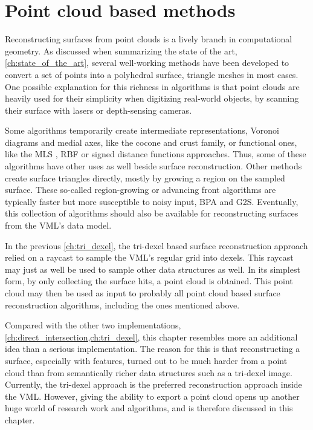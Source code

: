 
\chapter{Point cloud based methods}
\label{ch:point_cloud_based}

Reconstructing surfaces from point clouds is a lively branch in computational geometry.
As discussed when summarizing the state of the art, \cf \cref{ch:state_of_the_art}, several well-working methods have been developed to convert a set of points into a polyhedral surface, \ie triangle meshes in most cases.
One possible explanation for this richness in algorithms is that point clouds are heavily used for their simplicity when digitizing real-world objects, \eg by scanning their surface with lasers or depth-sensing cameras.

Some algorithms temporarily create intermediate representations, \eg Voronoi diagrams and medial axes, like the cocone \cite{cocone, tight_cocone, robust_cocone} and crust \cite{crust, power_crust} family, or functional ones, like the MLS \cite{mls}, RBF \cite{rbf} or signed distance functions \cite{sdf_surface_reconstruction} approaches.
Thus, some of these algorithms have other uses as well beside surface reconstruction.
Other methods create surface triangles directly, mostly by growing a region on the sampled surface.
These so-called region-growing or advancing front algorithms are typically faster but more susceptible to noisy input, \eg BPA and G2S.
Eventually, this collection of algorithms should also be available for reconstructing surfaces from the VML's data model.

In the previous \cref{ch:tri_dexel}, the tri-dexel based surface reconstruction approach relied on a raycast to sample the VML's regular grid into dexels.
This raycast may just as well be used to sample other data structures as well.
In its simplest form, by only collecting the surface hits, a point cloud is obtained.
This point cloud may then be used as input to probably all point cloud based surface reconstruction algorithms, including the ones mentioned above.

Compared with the other two implementations, \cf \cref{ch:direct_intersection,ch:tri_dexel}, this chapter resembles more an additional idea than a serious implementation.
The reason for this is that reconstructing a surface, especially with features, turned out to be much harder from a point cloud than from semantically richer data structures such as a tri-dexel image.
Currently, the tri-dexel approach is the preferred reconstruction approach inside the VML.
However, giving the ability to export a point cloud opens up another huge world of research work and algorithms, and is therefore discussed in this chapter.


